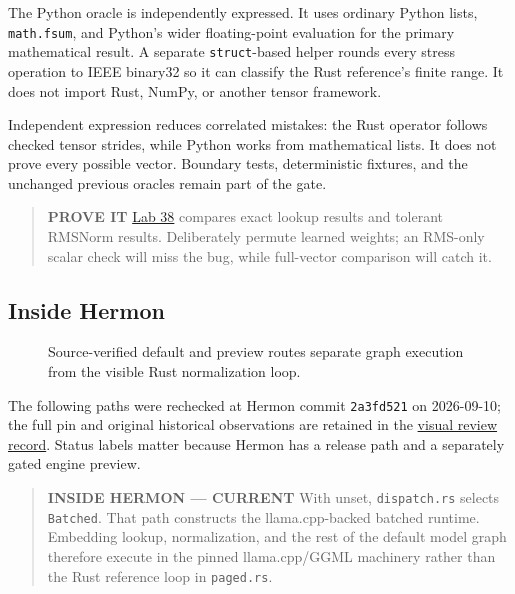 \documentclass[
  10pt,
]{article}
\begin{document}
The Python oracle is independently expressed. It uses ordinary Python
lists, \texttt{math.fsum}, and Python's wider floating-point evaluation
for the primary mathematical result. A separate \texttt{struct}-based
helper rounds every stress operation to IEEE binary32 so it can classify
the Rust reference's finite range. It does not import Rust, NumPy, or
another tensor framework.

Independent expression reduces correlated mistakes: the Rust operator
follows checked tensor strides, while Python works from mathematical
lists. It does not prove every possible vector. Boundary tests,
deterministic fixtures, and the unchanged previous oracles remain part
of the gate.

\begin{quote}
\textbf{PROVE IT}
\href{https://github.com/hermonai/inside-the-llm-engine/blob/astra-visual-rewrite/labs/lab-38-rust-python-rmsnorm.md}{Lab
38} compares exact lookup results and tolerant RMSNorm results.
Deliberately permute learned weights; an RMS-only scalar check will miss
the bug, while full-vector comparison will catch it.
\end{quote}

\subsection{Inside Hermon}\label{inside-hermon-3}

\begin{figure}[H]\centering\resizebox{\linewidth}{!}{}\caption{Source-verified default and preview routes separate graph execution from the visible Rust normalization loop.}\end{figure}

The following paths were rechecked at Hermon commit \texttt{2a3fd521} on
2026-09-10; the full pin and original historical observations are
retained in the
\href{https://github.com/hermonai/inside-the-llm-engine/blob/astra-visual-rewrite/research/astra/chapter07-regeneration.md}{visual
review record}. Status labels matter because Hermon has a release path
and a separately gated engine preview.

\begin{quote}
\textbf{INSIDE HERMON --- CURRENT} With
\texttt{} unset, \texttt{dispatch.rs}
selects \texttt{Batched}. That path constructs the llama.cpp-backed
batched runtime. Embedding lookup, normalization, and the rest of the
default model graph therefore execute in the pinned llama.cpp/GGML
machinery rather than the Rust reference loop in \texttt{paged.rs}.
\end{quote}
\end{document}
